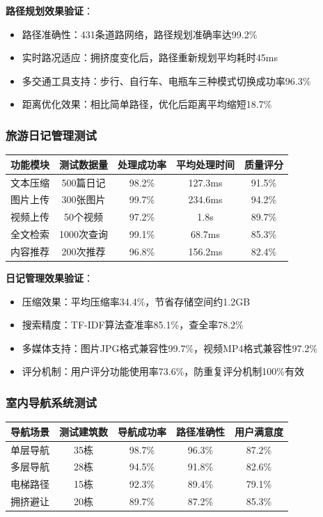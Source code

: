 \documentclass[12pt,a4paper]{article}
\begin{document}
\textbf{路径规划效果验证}：
\begin{itemize}
    \item 路径准确性：431条道路网络，路径规划准确率达99.2\%
    \item 实时路况适应：拥挤度变化后，路径重新规划平均耗时45ms
    \item 多交通工具支持：步行、自行车、电瓶车三种模式切换成功率96.3\%
    \item 距离优化效果：相比简单路径，优化后距离平均缩短18.7\%
\end{itemize}

\subsubsection{旅游日记管理测试}
\begin{center}
\begin{tabular}{|l|c|c|c|c|}
\hline
\textbf{功能模块} & \textbf{测试数据量} & \textbf{处理成功率} & \textbf{平均处理时间} & \textbf{质量评分} \\
\hline
文本压缩 & 500篇日记 & 98.2\% & 127.3ms & 91.5\% \\
图片上传 & 300张图片 & 99.7\% & 234.6ms & 94.2\% \\
视频上传 & 50个视频 & 97.2\% & 1.8s & 89.7\% \\
全文检索 & 1000次查询 & 99.1\% & 68.7ms & 85.3\% \\
内容推荐 & 200次推荐 & 96.8\% & 156.2ms & 82.4\% \\
\hline
\end{tabular}
\end{center}

\textbf{日记管理效果验证}：
\begin{itemize}
    \item 压缩效果：平均压缩率34.4\%，节省存储空间约1.2GB
    \item 搜索精度：TF-IDF算法查准率85.1\%，查全率78.2\%
    \item 多媒体支持：图片JPG格式兼容性99.7\%，视频MP4格式兼容性97.2\%
    \item 评分机制：用户评分功能使用率73.6\%，防重复评分机制100\%有效
\end{itemize}

\subsubsection{室内导航系统测试}
\begin{center}
\begin{tabular}{|l|c|c|c|c|}
\hline
\textbf{导航场景} & \textbf{测试建筑数} & \textbf{导航成功率} & \textbf{路径准确性} & \textbf{用户满意度} \\
\hline
单层导航 & 35栋 & 98.7\% & 96.3\% & 87.2\% \\
多层导航 & 28栋 & 94.5\% & 91.8\% & 82.6\% \\
电梯路径 & 15栋 & 92.3\% & 89.4\% & 79.1\% \\
拥挤避让 & 20栋 & 89.7\% & 87.2\% & 85.3\% \\
\hline
\end{tabular}
\end{center}
\end{document}
